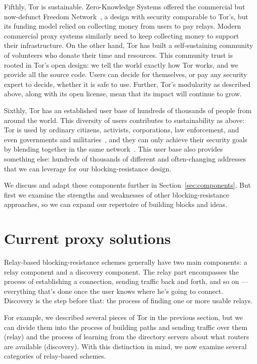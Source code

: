 \documentclass{llncs}
\begin{document}
Fifthly, Tor is sustainable. Zero-Knowledge Systems offered the commercial
but now-defunct Freedom Network~\cite{freedom21-security}, a design with
security comparable to Tor's, but its funding model relied on collecting
money from users to pay relays. Modern commercial proxy systems similarly
need to keep collecting money to support their infrastructure. On the
other hand, Tor has built a self-sustaining community of volunteers who
donate their time and resources. This community trust is rooted in Tor's
open design: we tell the world exactly how Tor works, and we provide all
the source code. Users can decide for themselves, or pay any security
expert to decide, whether it is safe to use. Further, Tor's modularity
as described above, along with its open license, mean that its impact
will continue to grow.

Sixthly, Tor has an established user base of hundreds of
thousands of people from around the world. This diversity of
users contributes to sustainability as above: Tor is used by
ordinary citizens, activists, corporations, law enforcement, and
even governments and militaries~\cite{tor-use-cases}, and they can
only achieve their security goals by blending together in the same
network~\cite{econymics,usability:weis2006}. This user base also provides
something else: hundreds of thousands of different and often-changing
addresses that we can leverage for our blocking-resistance design.

We discuss and adapt these components further in
Section~\ref{sec:components}. But first we examine the strengths and
weaknesses of other blocking-resistance approaches, so we can expand
our repertoire of building blocks and ideas.

\section{Current proxy solutions}
\label{sec:related}

Relay-based blocking-resistance schemes generally have two main
components: a relay component and a discovery component. The relay part
encompasses the process of establishing a connection, sending traffic
back and forth, and so on --- everything that's done once the user knows
where he's going to connect. Discovery is the step before that: the
process of finding one or more usable relays.

For example, we described several pieces of Tor in the previous section,
but we can divide them into the process of building paths and sending
traffic over them (relay) and the process of learning from the directory
servers about what routers are available (discovery). With this distinction
in mind, we now examine several categories of relay-based schemes.
\end{document}
